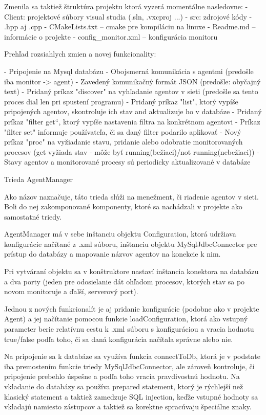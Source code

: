 \documentclass[a4paper,12pt]{article}
\begin{document}
Zmenila sa taktiež štruktúra projektu ktorá vyzerá momentálne nasledovne:
- Client: projektové súbory visual studia (.sln, .vxcproj ...)
- src: zdrojové kódy - .hpp aj .cpp
- CMakeLists.txt – cmake pre kompiláciu na linuxe
- Readme.md – informácie o projekte
- config\_monitor.xml – konfigurácia monitoru

Prehľad rozsiahlych zmien a novej funkcionality:

- Pripojenie na Mysql databázu
- Obojsmerná komunikácia s agentmi (predošle iba monitor -> agent)
- Zavedený komunikačný formát JSON (predošle: obyčajný text)
- Pridaný príkaz "discover" na vyhľadanie agentov v sieti (predošle sa tento proces dial len pri spustení programu)
- Pridaný príkaz "list", ktorý vypíše pripojených agentov, skontroluje ich stav and aktualizuje ho v databáze
- Pridaný príkaz "filter get“, ktorý vypíše nastavenia filtra na konkrétnom agentovi
- Príkaz "filter set" informuje používateľa, či sa daný filter podarilo aplikovať
- Nový príkaz "proc" na vyžiadanie stavu, pridanie alebo odobratie monitorovaných procesov (get vyžiada stav - môže byť running(bežiaci)/not running(nebežiaci))
- Stavy agentov a monitorované procesy sú periodicky aktualizované v databáze

Trieda AgentManager

Ako názov naznačuje, táto trieda slúži na menežment, či riadenie agentov v sieti. Boli do nej zakomponované komponenty, ktoré sa nachádzali v projekte ako samostatné triedy.

AgentManager má v sebe inštanciu objektu Configuration, ktorá udržiava konfigurácie načítané z .xml súboru, inštanciu objektu MySqlJdbcConnector pre prístup do databázy a mapovanie názvov agentov na konekcie k nim.

Pri vytváraní objektu sa v konštruktore nastaví inštancia konektora na databázu a dva porty (jeden pre odosielanie dát ohľadom procesov, ktorých stav sa po novom monitoruje a ďalší, serverový port). 

Jednou z nových funkcionalít je aj pridanie konfigurácie (podobne ako v projekte Agent) a jej načítanie pomocou funkcie loadConfiguration, ktorá ako vstupný parameter berie relatívnu cestu k .xml súboru s konfiguráciou a vracia hodnotu true/false podľa toho, či sa daná konfigurácia načítala správne alebo nie.

Na pripojenie sa k databáze sa využíva funkcia connectToDb, ktorá je v podstate iba premostením funkcie triedy MySqlJdbcConnector, ale zároveň kontroluje, či pripojenie prebehlo úspešne a podľa toho vracia pravdivostnú hodnotu. Na vkladanie do databázy sa používa prepared statement, ktorý je rýchlejší než klasický statement a taktiež zamedzuje SQL injection, keďže vstupné hodnoty sa vkladajú namiesto zástupcov a taktiež sa korektne spracúvaju špeciálne znaky.
\end{document}
